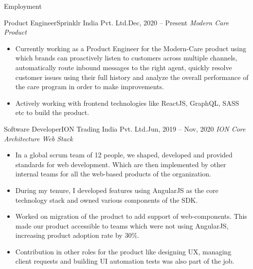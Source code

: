 \documentclass[]{format}
\begin{document}
	\makeheader
	\vspace{-3pt}
	\begin{cvsection}{Employment}
	
	    \vspace{2pt}
	
	    \begin{cvsubsection}{Product Engineer}{Sprinklr India Pvt. Ltd.}{Dec, 2020 – Present}
			\textit{Modern Care Product}
			\begin{itemize}
				\item Currently working as a Product Engineer for the Modern-Care product using which brands can proactively listen to customers across multiple channels, automatically route inbound messages to the right agent, quickly resolve customer issues using their full history and analyze the overall performance of the care program in order to make improvements.
				\item Actively working with frontend technologies like ReactJS, GraphQL, SASS etc to build the product.
			\end{itemize}
		\end{cvsubsection}
	
		\begin{cvsubsection}{Software Developer}{ION Trading India Pvt. Ltd.}{Jun, 2019 – Nov, 2020}
			\textit{ION Core Architecture Web Stack}
			\begin{itemize}
				\item In a global scrum team of 12 people, we shaped, developed and provided standards for web development. Which are then implemented by other internal teams for all the web-based products of the organization.
				\item During my tenure, I developed features using AngularJS as the core technology stack and owned various components of the SDK.
				\item Worked on migration of the product to add support of web-components. This made our product accessible to teams which were not using AngularJS, increasing product adoption rate by 30\%.
				\item Contribution in other roles for the product like designing UX, managing client requests and building UI automation tests was also part of the job.
			\end{itemize}
		\end{cvsubsection}
		

\end{cvsection}
\end{document}
